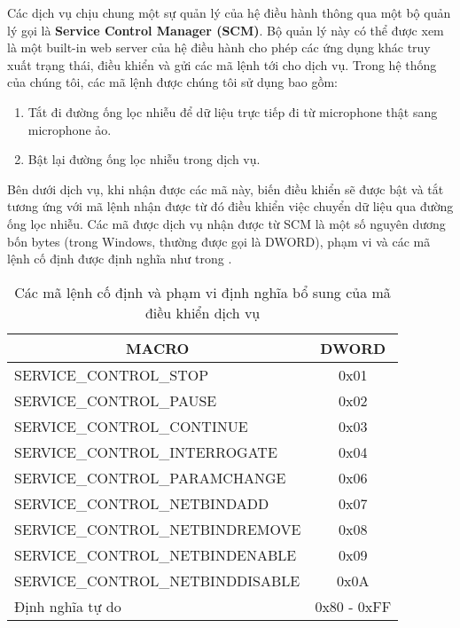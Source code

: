 		Các dịch vụ chịu chung một sự quản lý của hệ điều hành thông qua một bộ quản lý gọi là \textbf{Service Control Manager (SCM)}. Bộ quản lý này có thể được xem là một built-in web server của hệ điều hành cho phép các ứng dụng khác truy xuất trạng thái, điều khiển và gửi các mã lệnh tới cho dịch vụ. Trong hệ thống của chúng tôi, các mã lệnh được chúng tôi sử dụng bao gồm:
		
			\begin{enumerate}[1.]
				\item {} Tắt đi đường ống lọc nhiễu để dữ liệu trực tiếp đi từ microphone thật sang microphone ảo.
				\item {} Bật lại đường ống lọc nhiễu trong dịch vụ.
			\end{enumerate}
			
		Bên dưới dịch vụ, khi nhận được các mã này, biến điều khiển sẽ được bật và tắt tương ứng với mã lệnh nhận được từ đó điều khiển việc chuyển dữ liệu qua đường ống lọc nhiễu. Các mã được dịch vụ nhận được từ SCM là một số nguyên dương bốn bytes (trong Windows, thường được gọi là DWORD), phạm vi và các mã lệnh cố định được định nghĩa như trong .
		
			\begin{table}[h]
				\centering
				\begin{tabular}{l c}
					\hline
					\multicolumn{1}{c}{\textbf{MACRO}}		& \textbf{DWORD} \\
					\hline
					SERVICE\_CONTROL\_STOP					& 0x01 \\
					SERVICE\_CONTROL\_PAUSE					& 0x02 \\
					SERVICE\_CONTROL\_CONTINUE				& 0x03 \\
					SERVICE\_CONTROL\_INTERROGATE			& 0x04 \\
					SERVICE\_CONTROL\_PARAMCHANGE			& 0x06 \\
					SERVICE\_CONTROL\_NETBINDADD			& 0x07 \\
					SERVICE\_CONTROL\_NETBINDREMOVE			& 0x08 \\
					SERVICE\_CONTROL\_NETBINDENABLE			& 0x09 \\
					SERVICE\_CONTROL\_NETBINDDISABLE		& 0x0A \\
					\hline
					Định nghĩa tự do						& 0x80 - 0xFF \\
					\hline
				\end{tabular}
				\caption{Các mã lệnh cố định và phạm vi định nghĩa bổ sung của mã điều khiển dịch vụ}
				\label{design::svc_control_code}
			\end{table}
		

